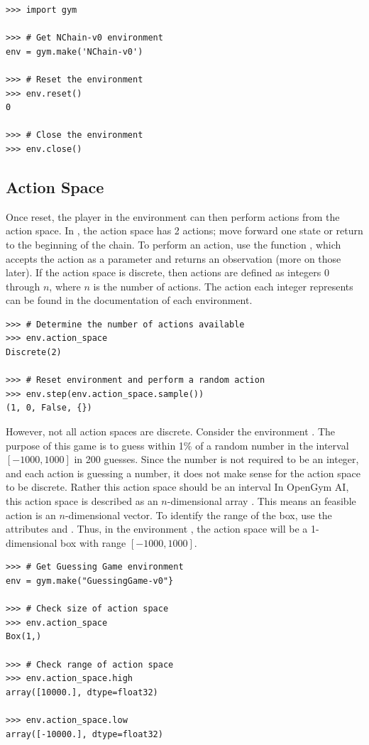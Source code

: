 \begin{lstlisting}
>>> import gym

>>> # Get NChain-v0 environment
env = gym.make('NChain-v0')

>>> # Reset the environment
>>> env.reset()
0

>>> # Close the environment
>>> env.close()
\end{lstlisting}

\subsection*{Action Space}
Once reset, the player in the environment can then perform actions from the action space.
In , the action space has 2 actions; move forward one state or return to the beginning of the chain.
To perform an action, use the function , which accepts the action as a parameter and returns an observation (more on those later).
If the action space is discrete, then actions are defined as integers 0 through $n$, where $n$ is the number of actions.
The action each integer represents can be found in the documentation of each environment.

\begin{lstlisting}
>>> # Determine the number of actions available
>>> env.action_space
Discrete(2)

>>> # Reset environment and perform a random action
>>> env.step(env.action_space.sample())
(1, 0, False, {})
\end{lstlisting} 

However, not all action spaces are discrete.
Consider the environment .
The purpose of this game is to guess within 1\% of a random number in the interval $[-1000,1000]$ in 200 guesses.
Since the number is not required to be an integer, and each action is guessing a number, it does not make sense for the action space to be discrete.
Rather this action space should be an interval
In OpenGym AI, this action space is described as an $n$-dimensional array .
This means an feasible action is an $n$-dimensional vector.
To identify the range of the box, use the attributes  and .
Thus, in the environment , the action space will be a 1-dimensional box with range $[-1000,1000]$.

\begin{lstlisting}
>>> # Get Guessing Game environment
env = gym.make("GuessingGame-v0"}

>>> # Check size of action space
>>> env.action_space
Box(1,)

>>> # Check range of action space
>>> env.action_space.high
array([10000.], dtype=float32)

>>> env.action_space.low
array([-10000.], dtype=float32)
\end{lstlisting}

